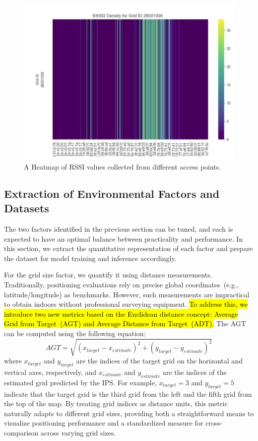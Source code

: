 \documentclass[runningheads]{llncs}
\newcommand{\hlgreen}[1]{\sethlcolor{lightgreen}\hl{#1}}
\begin{document}
\begin{figure}[th!]
        \centering
        \includegraphics[width=0.7\linewidth]{figures/meth3.jpg}
        \caption{A Heatmap of RSSI values collected from different access points.}
        \label{fig:heatmap}
\end{figure}

\subsection{Extraction of Environmental Factors and Datasets}\label{ssec:extraction}

The two factors identified in the previous section can be tuned, and each is expected to have an optimal balance between practicality and performance. In this section, we extract the quantitative representation of each factor and prepare the dataset for model training and inference accordingly.

For the grid size factor, we quantify it using distance measurements. Traditionally, positioning evaluations rely on precise global coordinates~(e.g., latitude/longitude) as benchmarks. However, such measurements are impractical to obtain indoors without professional surveying equipment. \hlgreen{To address this, we introduce two new metrics based on the Euclidean distance concept: Average Grid from Target~(AGT) and Average Distance from Target~(ADT).} The AGT can be computed using the following equation:
\begin{equation}
        AGT = \sqrt{(x_{target} - x_{estimate})^2 + (y_{target} - y_{estimate})^2}
        \label{eq:agt}
\end{equation}
where $x_{target}$ and $y_{target}$ are the indices of the target grid on the horizontal and vertical axes, respectively, and $x_{estimate}$ and $y_{estimate}$ are the indices of the estimated grid predicted by the IPS. For example, $x_{target} = 3$ and $y_{target} = 5$ indicate that the target grid is the third grid from the left and the fifth grid from the top of the map. By treating grid indices as distance units, this metric naturally adapts to different grid sizes, providing both a straightforward means to visualize positioning performance and a standardized measure for cross-comparison across varying grid sizes. 
\end{document}
